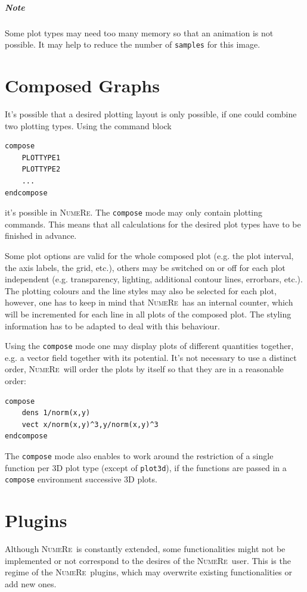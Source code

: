 \documentclass[DIV=14,headsepline,footsepline]{scrbook}
\newcommand{\NR}{\textsc{Nu\-me\-Re}}
\begin{document}
			\paragraph{Note}
				Some plot types may need too many memory so that an animation is not possible. It may help to reduce the number of \verb+samples+ for this image.
		\chapter{Composed Graphs}
			It's possible that a desired plotting layout is only possible, if one could combine two plotting types. Using the command block
			\begin{lstlisting}
compose
	PLOTTYPE1
	PLOTTYPE2
	...
endcompose
			\end{lstlisting}
			it's possible in \NR. The \verb+compose+ mode may only contain plotting commands. This means that all calculations for the desired plot types have to be finished in advance.
			
			Some plot options are valid for the whole composed plot (e.g. the plot interval, the axis labels, the grid, etc.), others may be switched on or off for each plot independent (e.g. transparency, lighting, additional contour lines, errorbars, etc.). The plotting colours and the line styles may also be selected for each plot, however, one has to keep in mind that \NR\ has an internal counter, which will be incremented for each line in all plots of the composed plot. The styling information has to be adapted to deal with this behaviour.
			
			Using the \verb+compose+ mode one may display plots of different quantities together, e.g. a vector field together with its potential. It's not necessary to use a distinct order, \NR\ will order the plots by itself so that they are in a reasonable order:
			\begin{lstlisting}
compose
	dens 1/norm(x,y)
	vect x/norm(x,y)^3,y/norm(x,y)^3
endcompose
			\end{lstlisting}
			
			The \verb+compose+ mode also enables to work around the restriction of a single function per 3D plot type (except of \verb+plot3d+), if the functions are passed in a \verb+compose+ environment successive 3D plots.
		\chapter{Plugins}
			Although \NR\ is constantly extended, some functionalities might not be implemented or not correspond to the desires of the \NR\ user. This is the regime of the \NR\ plugins, which may overwrite existing functionalities or add new ones.
\end{document}

